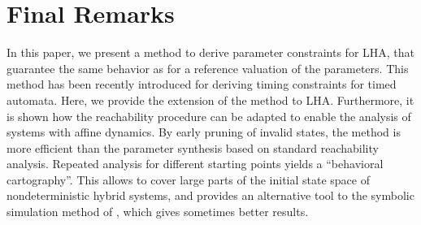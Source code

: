 \documentclass{llncs}
\begin{document}

\section{Final Remarks}\label{sec:concl}
In this paper, we present a method to derive parameter constraints
for LHA, that guarantee the same behavior as for a reference valuation
of the parameters. 
This method has been recently introduced
for deriving timing constraints for timed automata. Here, we provide
the extension of the method to LHA. Furthermore, it is shown how the
reachability procedure can be adapted to enable the analysis of
systems with affine dynamics. 
%
By early pruning of invalid states, the method is
more efficient than the parameter synthesis based on standard
reachability analysis.  Repeated analysis for different starting
points yields a ``behavioral cartography''. This allows to cover
large parts of the initial state space of nondeterministic hybrid
systems, and provides an alternative tool to the symbolic simulation
method of \cite{AKRS:2008}, which gives sometimes better results.




\end{document}
